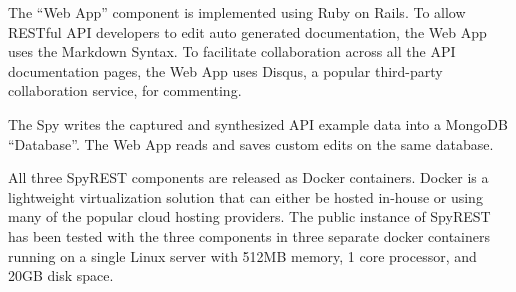 The ``Web App'' component is implemented using Ruby on Rails. To allow RESTful API developers to edit auto generated documentation, the Web App uses the Markdown Syntax. To facilitate collaboration across all the API documentation pages, the Web App uses Disqus, a popular third-party collaboration service, for commenting.

The Spy writes the captured and synthesized API example data into a MongoDB ``Database''. The Web App reads and saves custom edits on the same database.

All three SpyREST components are released as Docker containers. Docker is a lightweight virtualization solution that can either be hosted in-house or using many of the popular cloud hosting providers. The public instance of SpyREST has been tested with the three components in three separate docker containers running on a single Linux server with 512MB memory, 1 core processor, and 20GB disk space.

